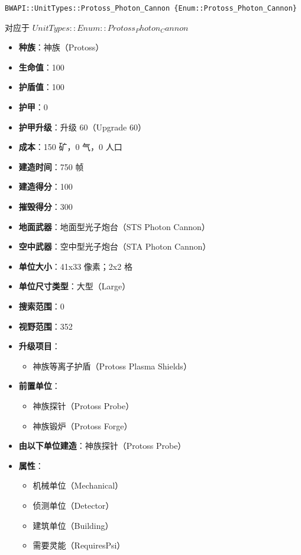 \begin{tcolorbox}[colback=white, colframe=black!60!white, title=Protoss\_Photon\_Cannon(), arc=0mm]
    \begin{verbatim}
BWAPI::UnitTypes::Protoss_Photon_Cannon {Enum::Protoss_Photon_Cannon}
    \end{verbatim}
    对应于  $ UnitTypes::Enum::Protoss_Photon_Cannon $ 
    \begin{itemize}
        \item \textbf{种族}：神族（Protoss）
        \item \textbf{生命值}：100
        \item \textbf{护盾值}：100
        \item \textbf{护甲}：0
        \item \textbf{护甲升级}：升级 60（Upgrade 60）
        \item \textbf{成本}：150 矿，0 气，0 人口
        \item \textbf{建造时间}：750 帧
        \item \textbf{建造得分}：100
        \item \textbf{摧毁得分}：300
        \item \textbf{地面武器}：地面型光子炮台（STS Photon Cannon）
        \item \textbf{空中武器}：空中型光子炮台（STA Photon Cannon）
        \item \textbf{单位大小}：41x33 像素；2x2 格
        \item \textbf{单位尺寸类型}：大型（Large）
        \item \textbf{搜索范围}：0
        \item \textbf{视野范围}：352
        \item \textbf{升级项目}：
            \begin{itemize}
                \item 神族等离子护盾（Protoss Plasma Shields）
            \end{itemize}
        \item \textbf{前置单位}：
            \begin{itemize}
                \item 神族探针（Protoss Probe）
                \item 神族锻炉（Protoss Forge）
            \end{itemize}
        \item \textbf{由以下单位建造}：神族探针（Protoss Probe）
        \item \textbf{属性}：
            \begin{itemize}
                \item 机械单位（Mechanical）
                \item 侦测单位（Detector）
                \item 建筑单位（Building）
                \item 需要灵能（RequiresPsi）
            \end{itemize}
    \end{itemize}
\end{tcolorbox}

